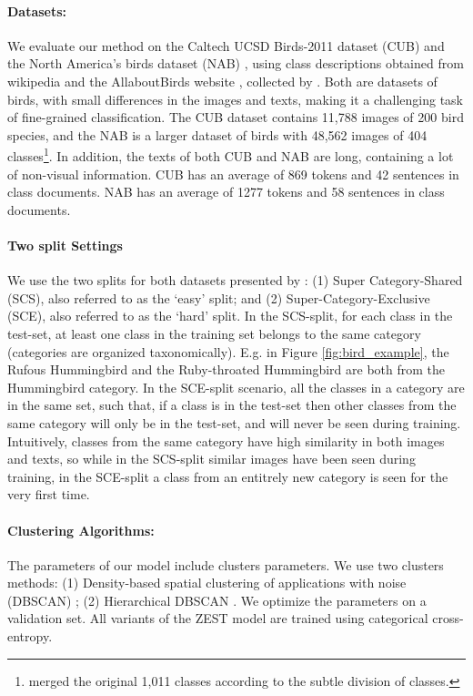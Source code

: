 \documentclass[11pt,a4paper]{article}
\begin{document}
\paragraph{Datasets:}  We evaluate our method on the Caltech UCSD Birds-2011 dataset (CUB) \citet{wah2011caltech} and the North America’s birds dataset (NAB) \cite{van2015building}, using class descriptions obtained from wikipedia and the AllaboutBirds website \cite{AllaboutBirds}, collected by \citet{elhoseiny2017link}. 
Both are datasets of birds, with small differences in the images and texts, making it a challenging task of fine-grained classification. The CUB dataset contains 11,788 images of 200 bird species, and the NAB
is a larger dataset of birds with 48,562 images of 404 classes\footnote{\citet{elhoseiny2017link} merged the original 1,011 classes according to the subtle division of classes.}.
In addition, the texts of both CUB and NAB are long, containing a lot of non-visual information. CUB has an average of 869 tokens and 42 sentences in class documents. NAB has an average of 1277 tokens and 58 sentences in class documents. 

\paragraph{Two split Settings} We use the two splits for both datasets presented by \citet{elhoseiny2017link}: (1) Super Category-Shared (SCS), also referred to as the \enquote*{easy} split; and (2) Super-Category-Exclusive (SCE), also referred to as the \enquote*{hard} split. In the SCS-split, for each class in the test-set, at least one class in the training set belongs to the same category (categories are organized taxonomically). E.g. in Figure \ref{fig:bird_example}, the Rufous Hummingbird and the Ruby-throated Hummingbird are both from the Hummingbird category. In the SCE-split scenario, all the classes in a category are in the same set, such that, if a class is in the test-set then other classes from the same category will only be in the test-set, and will never be seen during training. Intuitively, classes from the same category have high similarity in both images and texts, so while in the SCS-split similar images have been seen during training, in the SCE-split a class from an entitrely new category is seen for the very first time. %

\paragraph{Clustering Algorithms:}
The parameters of our model include clusters parameters.
We use two clusters methods: (1) Density-based spatial clustering of applications with noise (DBSCAN) \citep{ester1996density}; (2) Hierarchical DBSCAN \citep{mcinnes2017hdbscan}.
We optimize the parameters on a validation set. All variants of the ZEST model are trained using categorical cross-entropy.
\end{document}
